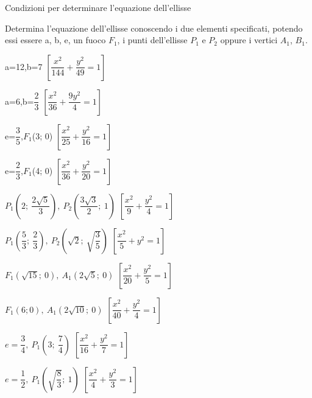 Condizioni per determinare l'equazione dell'ellisse
\begin{esercizio}
  \label{ese:div.003}
  Determina l'equazione dell'ellisse conoscendo i due elementi 
specificati, potendo essi essere a, b, e, un fuoco \( F_{1}\), i punti 
dell'ellisse \( P_{1} \) e \( P_{2} \) oppure i vertici \( A_{1} \), \( B_{1} \).
  \begin{enumeratea}
   \item a=12,\quad b=7
   \hfill \(\left[ \dfrac{x^{2}}{144} + \dfrac{y^{2}}{49} =1\right]\)
   \item a=6,\quad b=\( \dfrac{2}{3} \)
   \hfill \(\left[ \dfrac{x^{2}}{36} + \dfrac{9y^{2}}{4} =1\right]\)
   \item e=\( \dfrac{3}{5} \),\quad \( F_{1}\)(3; 0)
   \hfill \(\left[ \dfrac{x^{2}}{25} + \dfrac{y^{2}}{16} =1\right]\)
   \item e=\( \dfrac{2}{3} \),\quad \( F_{1}\)(4; 0)
   \hfill \(\left[ \dfrac{x^{2}}{36} + \dfrac{y^{2}}{20} =1\right]\)
   \item \( P_{1}  \left(2; ~ \dfrac{2\sqrt{5}}{3} \right),~  P_{2} \left( 
\dfrac{3\sqrt{3}}{2}; ~ 1\right)\)
   \hfill \(\left[ \dfrac{x^{2}}{9} + \dfrac{y^{2}}{4} =1\right]\)
   \item \( P_{1} \left( \dfrac{5}{3} ; ~ \dfrac{2}{3} \right), ~  P_{2} 
\left( \sqrt{2} ; ~ \sqrt{\dfrac{3}{5}} \right)\)
   \hfill \(\left[ \dfrac{x^{2}}{5} + y^{2} =1\right]\)
   \item \( F_{1}\left( \sqrt{15} ;~ 0\right),~ A_{1}\left(2 \sqrt{5} ;~ 
0\right)\)
   \hfill \(\left[\dfrac{x^{2}}{20} + \dfrac{y^{2}}{5} =1\right]\)
   \item \( F_{1}(6; 0),~ A_{1}\left(2 \sqrt{10} ; ~0\right)\)
   \hfill \(\left[ \dfrac{x^{2}}{40} + \dfrac{y^{2}}{4} =1\right]\)
   \item  \(e= \dfrac{3}{4} ,~ P_{1}\left(3; ~ \dfrac{7}{4} \right)\)
   \hfill  \(\left[ \dfrac{x^{2}}{16} + \dfrac{y^{2}}{7} =1\right]\)
   \item \(e= \dfrac{1}{2} ,~ P_{1}\left( \sqrt{\dfrac{8}{3}} ;~ 1\right)\)
   \hfill \(\left[ \dfrac{x^{2}}{4} + \dfrac{y^{2}}{3} =1\right]\)
  
  \end{enumeratea}
\end{esercizio}

% 
% 

